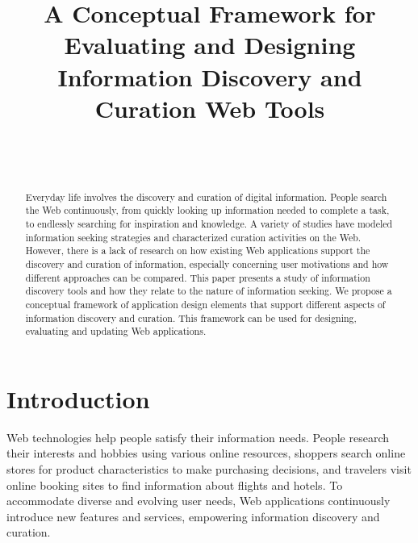 \documentclass{sigchi}
\begin{document}
\title{A Conceptual Framework for Evaluating and Designing Information Discovery and Curation Web Tools}

\author{%
  \\
  \\
}

\maketitle

\begin{abstract}
  Everyday life involves the discovery and curation of digital information. People search the Web continuously, from quickly looking up information needed to complete a task, to endlessly searching for inspiration and knowledge. A variety of studies have modeled information seeking strategies and characterized curation activities on the Web. However, there is a lack of research on how existing Web applications support the discovery and curation of information, especially concerning user motivations and how different approaches can be compared. This paper presents a study of information discovery tools and how they relate to the nature of information seeking. We propose a conceptual framework of application design elements that support different aspects of information discovery and curation. This framework can be used for designing, evaluating and updating Web applications.
\end{abstract}



\section{Introduction}
\label{section:introduction}
Web technologies help people satisfy their information needs. People research their interests and hobbies using various online resources, shoppers search online stores for product characteristics to make purchasing decisions, and travelers visit online booking sites to find information about flights and hotels. To accommodate diverse and evolving user needs, Web applications continuously introduce new features and services, empowering information discovery and curation. 
\end{document}
